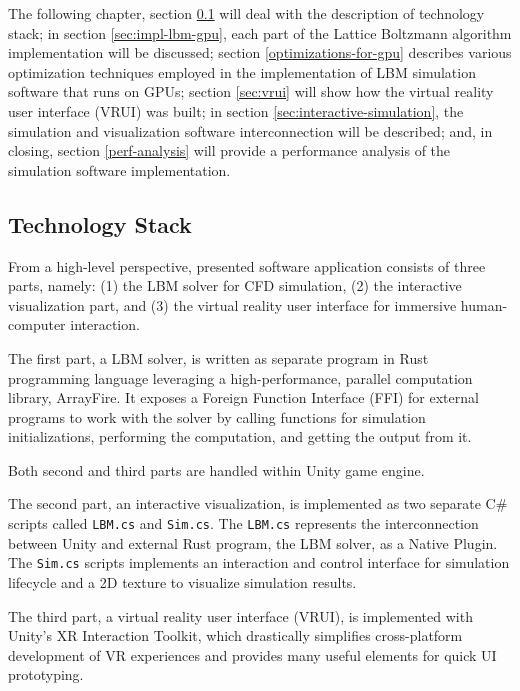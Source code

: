 The following chapter, section \ref{sec:tech-stack} will deal with the description of technology stack; in section \ref{sec:impl-lbm-gpu}, each part of the Lattice Boltzmann algorithm implementation will be discussed; section \ref{optimizations-for-gpu} describes various optimization techniques employed  in the implementation of LBM simulation software that runs on GPUs; section \ref{sec:vrui} will show how the virtual reality user interface (VRUI) was built; in section \ref{sec:interactive-simulation}, the simulation and visualization software interconnection will be described; and, in closing,  section \ref{perf-analysis} will provide a performance analysis of the simulation software implementation.

\subsection{Technology Stack} \label{sec:tech-stack}
From a high-level perspective, presented software application consists of three parts, namely: (1) the LBM solver for CFD simulation, (2) the interactive visualization part, and (3) the virtual reality user interface for immersive human-computer interaction.

The first part, a LBM solver, is written as separate program in Rust programming language leveraging a high-performance, parallel computation library, ArrayFire. It exposes a Foreign Function Interface (FFI) for external programs to work with the solver by calling functions for simulation initializations, performing the computation, and getting the output from it.

Both second and third parts are handled within Unity game engine.

The second part, an interactive visualization, is implemented as two separate C\# scripts called \texttt{LBM.cs} and \texttt{Sim.cs}. The \texttt{LBM.cs} represents the interconnection between Unity and external Rust program, the LBM solver, as a Native Plugin. The \texttt{Sim.cs} scripts implements an interaction and control interface for simulation lifecycle and a 2D texture to visualize simulation results.

The third part, a virtual reality user interface (VRUI), is implemented with Unity's XR Interaction Toolkit, which drastically simplifies cross-platform development of VR experiences and provides many useful elements for quick UI prototyping.


